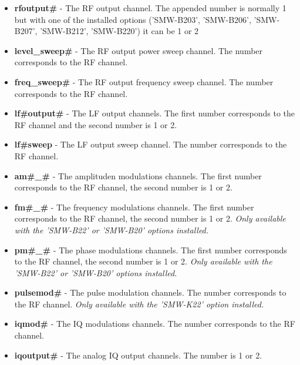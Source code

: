 \documentclass[11pt]{article} %
\begin{document}
\begin{itemize}

\item {\bf rfoutput\#} - The RF output channel. The appended number is normally 1 but with one of the installed options ('SMW-B203', 'SMW-B206', 'SMW-B207', 'SMW-B212', 'SMW-B220') it can be 1 or 2

\item {\bf level\_sweep\#} - The RF output power sweep channel. The number corresponds to the RF channel.

\item {\bf freq\_sweep\#} - The RF output frequency sweep channel. The number corresponds to the RF channel.

\item {\bf lf\#output\#} - The LF output channels. The first number corresponds to the RF channel and the second number is 1 or 2.

\item {\bf lf\#sweep} - The LF output sweep channel. The number corresponds to the RF channel.

\item {\bf am\#\_\#} - The amplituden modulations channels. The first number corresponds to the RF channel, the second number is 1 or 2.

\item {\bf fm\#\_\#} - The frequency modulations channels. The first number corresponds to the RF channel, the second number is 1 or 2. {\it Only available with the 'SMW-B22' or 'SMW-B20' options installed.}

\item {\bf pm\#\_\#} - The phase modulations channels. The first number corresponds to the RF channel, the second number is 1 or 2. {\it Only available with the 'SMW-B22' or 'SMW-B20' options installed.}

\item {\bf pulsemod\#} - The pulse modulation channels. The number corresponds to the RF channel. {\it Only available with the 'SMW-K22' option installed.}

\item {\bf iqmod\#} - The IQ modulations channels. The number corresponds to the RF channel.

\item {\bf iqoutput\#} -  The analog IQ output channels. The number is 1 or 2.

\end{itemize}
\end{document}
